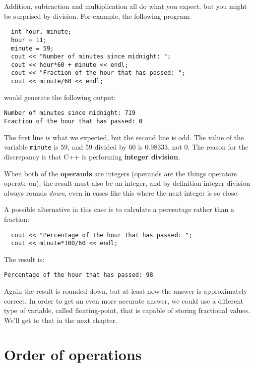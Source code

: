 
Addition, subtraction and multiplication all do what you
expect, but you might be surprised by division.  For example,
the following program:

\begin{verbatim}
  int hour, minute;
  hour = 11;
  minute = 59;
  cout << "Number of minutes since midnight: ";
  cout << hour*60 + minute << endl;
  cout << "Fraction of the hour that has passed: ";
  cout << minute/60 << endl;
\end{verbatim}
%
would generate the following output:

\begin{verbatim}
Number of minutes since midnight: 719
Fraction of the hour that has passed: 0
\end{verbatim}
%
The first line is what we expected, but the second line is
odd.  The value of the variable {\tt minute} is 59, and
59 divided by 60 is 0.98333, not 0.  The reason for the
discrepancy is that C++ is performing {\bf integer division}.


When both of the {\bf operands} are integers (operands are the things
operators operate on), the result must also be an integer,
and by definition integer division always rounds {\em down},
even in cases like this where the next integer is so close.

A possible alternative in this case is to calculate a percentage
rather than a fraction:

\begin{verbatim}
  cout << "Percentage of the hour that has passed: ";
  cout << minute*100/60 << endl;
\end{verbatim}
%
The result is:

\begin{verbatim}
Percentage of the hour that has passed: 98
\end{verbatim}
%
Again the result is rounded down, but at least now the answer
is approximately correct.  In order to get an even more accurate
answer, we could use a different type of variable, called
floating-point, that is capable of storing fractional values.
We'll get to that in the next chapter.

\section{Order of operations}

